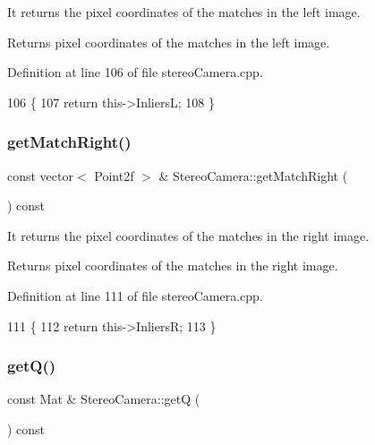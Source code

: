 It returns the pixel coordinates of the matches in the left image. 

\begin{DoxyReturn}{Returns}
pixel coordinates of the matches in the left image. 
\end{DoxyReturn}


Definition at line 106 of file stereo\+Camera.\+cpp.


\begin{DoxyCode}
106                                                         \{
107     \textcolor{keywordflow}{return} this->InliersL;
108 \}
\end{DoxyCode}
\mbox{\label{classStereoCamera_ac8b01bc577cc3de8e7e8bc246d5c50f0}} 
\subsubsection{\texorpdfstring{get\+Match\+Right()}{getMatchRight()}}
{\footnotesize\ttfamily const vector$<$ Point2f $>$ \& Stereo\+Camera\+::get\+Match\+Right (\begin{DoxyParamCaption}{ }\end{DoxyParamCaption}) const}



It returns the pixel coordinates of the matches in the right image. 

\begin{DoxyReturn}{Returns}
pixel coordinates of the matches in the right image. 
\end{DoxyReturn}


Definition at line 111 of file stereo\+Camera.\+cpp.


\begin{DoxyCode}
111                                                          \{
112     \textcolor{keywordflow}{return} this->InliersR;
113 \}
\end{DoxyCode}
\mbox{\label{classStereoCamera_a9f10e66261a0211e5d786abc3df8a70b}} 
\subsubsection{\texorpdfstring{get\+Q()}{getQ()}}
{\footnotesize\ttfamily const Mat \& Stereo\+Camera\+::getQ (\begin{DoxyParamCaption}{ }\end{DoxyParamCaption}) const}




